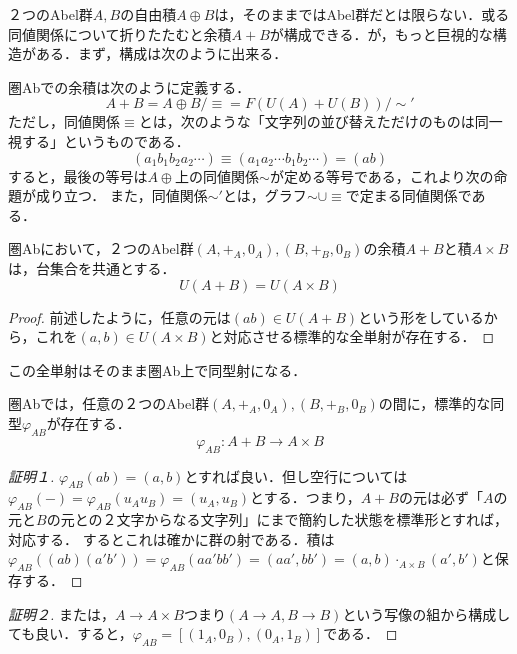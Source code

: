 \documentclass[uplatex, 12pt, dvipdfmx]{jsarticle}
\begin{document}
\begin{example}
    ２つのAbel群$A,B$の自由積$A\oplus B$は，そのままではAbel群だとは限らない．或る同値関係について折りたたむと余積$A+B$が構成できる．が，もっと巨視的な構造がある．まず，構成は次のように出来る．
    \begin{definition*}[Abでの余積]
        圏Abでの余積は次のように定義する．
        \[ A+B=A\oplus B/\equiv =F(U(A)+U(B))/\sim' \]
        ただし，同値関係$\equiv$とは，次のような「文字列の並び替えただけのものは同一視する」というものである．
        \[ (a_1b_1b_2a_2\cdots)\equiv (a_1a_2\cdots b_1b_2\cdots) = (ab) \]
        すると，最後の等号は$A\oplus$上の同値関係$\sim$が定める等号である，これより次の命題が成り立つ．
        また，同値関係$\sim'$とは，グラフ$\sim\cup\equiv$で定まる同値関係である．
    \end{definition*}
    \begin{proposition*}
        圏Abにおいて，２つのAbel群$(A,+_A,0_A),(B,+_B,0_B)$の余積$A+B$と積$A\times B$は，台集合を共通とする．
        \[ U(A+B)=U(A\times B) \]
    \end{proposition*}
    \begin{proof}
        前述したように，任意の元は$(ab)\in U(A+B)$という形をしているから，これを$(a,b)\in U(A\times B)$と対応させる標準的な全単射が存在する．
    \end{proof}
    この全単射はそのまま圏Ab上で同型射になる．
    \begin{proposition}
        圏Abでは，任意の２つのAbel群$(A,+_A,0_A),(B,+_B,0_B)$の間に，標準的な同型$\varphi_{AB}$が存在する．
        \[ \varphi_{AB}:A+B\to A\times B \]
    \end{proposition}
    \begin{proof}[証明１]
        $\varphi_{AB}(ab)=(a,b)$とすれば良い．但し空行については$\varphi_{AB}(-)=\varphi_{AB}(u_Au_B)=(u_A,u_B)$とする．つまり，$A+B$の元は必ず「$A$の元と$B$の元との２文字からなる文字列」にまで簡約した状態を標準形とすれば，対応する．
        するとこれは確かに群の射である．積は$\varphi_{AB}((ab)(a'b'))=\varphi_{AB}(aa'bb')=(aa',bb')=(a,b)\cdot_{A\times B}(a',b')$と保存する．
    \end{proof}
    \begin{proof}[証明２]
        または，$A\to A\times B$つまり$(A\to A,B\to B)$という写像の組から構成しても良い．すると，$\varphi_{AB}=[(1_A,0_B),(0_A,1_B)]$である．
    \end{proof}
    \begin{remark*}

\end{remark*}
\end{example}
\end{document}
